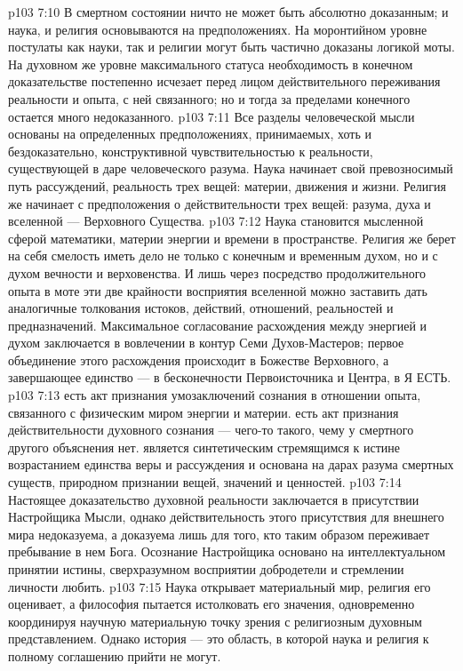 \vs p103 7:10 \pc В смертном состоянии ничто не может быть абсолютно доказанным; и наука, и религия основываются на предположениях. На моронтийном уровне постулаты как науки, так и религии могут быть частично доказаны логикой моты. На духовном же уровне максимального статуса необходимость в конечном доказательстве постепенно исчезает перед лицом действительного переживания реальности и опыта, с ней связанного; но и тогда за пределами конечного остается много недоказанного.
\vs p103 7:11 Все разделы человеческой мысли основаны на определенных предположениях, принимаемых, хоть и бездоказательно, конструктивной чувствительностью к реальности, существующей в даре человеческого разума. Наука начинает свой превозносимый путь рассуждений,  реальность трех вещей: материи, движения и жизни. Религия же начинает с предположения о действительности трех вещей: разума, духа и вселенной --- Верховного Существа.
\vs p103 7:12 Наука становится мысленной сферой математики, материи энергии и времени в пространстве. Религия же берет на себя смелость иметь дело не только с конечным и временным духом, но и с духом вечности и верховенства. И лишь через посредство продолжительного опыта в моте эти две крайности восприятия вселенной можно заставить дать аналогичные толкования истоков, действий, отношений, реальностей и предназначений. Максимальное согласование расхождения между энергией и духом заключается в вовлечении в контур Семи Духов\hyp{}Мастеров; первое объединение этого расхождения происходит в Божестве Верховного, а завершающее единство --- в бесконечности Первоисточника и Центра, в Я ЕСТЬ.
\vs p103 7:13 \pc {} есть акт признания умозаключений сознания в отношении опыта, связанного с физическим миром энергии и материи.  есть акт признания действительности духовного сознания --- чего\hyp{}то такого, чему у смертного другого объяснения нет.  является синтетическим стремящимся к истине возрастанием единства веры и рассуждения и основана на дарах разума смертных существ, природном признании вещей, значений и ценностей.
\vs p103 7:14 \pc Настоящее доказательство духовной реальности заключается в присутствии Настройщика Мысли, однако действительность этого присутствия для внешнего мира недоказуема, а доказуема лишь для того, кто таким образом переживает пребывание в нем Бога. Осознание Настройщика основано на интеллектуальном принятии истины, сверхразумном восприятии добродетели и стремлении личности любить.
\vs p103 7:15 Наука открывает материальный мир, религия его оценивает, а философия пытается истолковать его значения, одновременно координируя научную материальную точку зрения с религиозным духовным представлением. Однако история --- это область, в которой наука и религия к полному соглашению прийти не могут.
